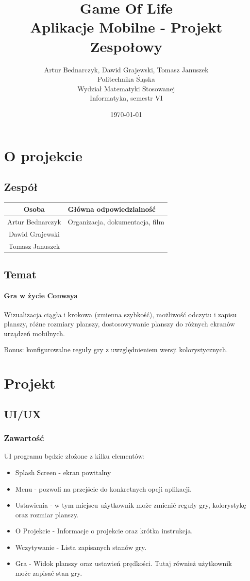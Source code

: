 \documentclass[12pt,a4paper]{article}
\title{Game Of Life\\Aplikacje Mobilne - Projekt Zespołowy}
\author{Artur Bednarczyk, Dawid Grajewski, Tomasz Januszek\\Politechnika Śląska\\Wydział Matematyki Stosowanej\\Informatyka, semestr VI}
\date{\today}
\begin{document}
\maketitle
\newpage
\tableofcontents
\newpage
\section{O projekcie}
\subsection{Zespół}
\begin{tabular}{c|l}
Osoba & Główna odpowiedzialność \\
\hline
Artur Bednarczyk & Organizacja, dokumentacja, film \\
Dawid Grajewski &  \\
Tomasz Januszek & 
\end{tabular}
\subsection{Temat}
\paragraph{Gra w życie Conwaya}
Wizualizacja ciągła i krokowa (zmienna szybkość), możliwość odczytu i zapisu planszy, różne rozmiary planszy, dostosowywanie planszy do różnych ekranów urządzeń mobilnych.
	
	Bonus: konfigurowalne reguły gry z uwzględnieniem wersji kolorystycznych.

\section{Projekt}
\subsection{UI/UX}
\subsubsection{Zawartość}
UI programu będzie złożone z kilku elementów:
\begin{itemize}
	\item Splash Screen - ekran powitalny
	\item Menu - pozwoli na przejście do konkretnych opcji aplikacji.
	\item Ustawienia - w tym miejscu użytkownik może zmienić reguły gry, kolorystykę oraz rozmiar planszy.
	\item O Projekcie - Informacje o projekcie oraz krótka instrukcja.
	\item Wczytywanie - Lista zapisanych stanów gry.
	\item Gra - Widok planszy oraz ustawień prędkości. Tutaj również użytkownik może zapisać stan gry.
\end{itemize}
\end{document}

